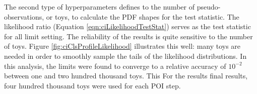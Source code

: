 The second type of hyperparameters defines to the number of pseudo-observations, or toys, to calculate the PDF shapes for the test statistic.
The likelihood ratio (Equation \ref{eqn:ciLikelihoodTestStat}) serves as the test statistic for all limit setting.
The reliability of the results is quite sensitive to the number of toys.
Figure \ref{fig:ciClsProfileLikelihood} illustrates this well: many toys are needed in order to smoothly sample the tails of the likelihood distributions.
In this analysis, the limits were found to converge to a relative accuracy of $10^{-2}$ between one and two hundred thousand toys.
This 
For the results final results, four hundred thousand toys were used for each POI step.
